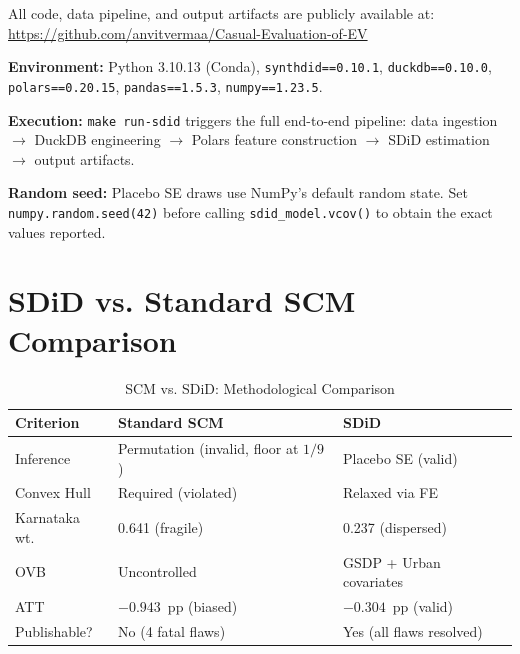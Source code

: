 \documentclass[journal]{IEEEtran}
\begin{document}
All code, data pipeline, and output artifacts are publicly available at:
\url{https://github.com/anvitvermaa/Casual-Evaluation-of-EV}

\noindent\textbf{Environment:} Python 3.10.13 (Conda), 
\texttt{synthdid==0.10.1}, \texttt{duckdb==0.10.0}, 
\texttt{polars==0.20.15}, \texttt{pandas==1.5.3}, 
\texttt{numpy==1.23.5}.

\noindent\textbf{Execution:} \texttt{make run-sdid} triggers the full 
end-to-end pipeline: data ingestion $\rightarrow$ DuckDB engineering 
$\rightarrow$ Polars feature construction $\rightarrow$ SDiD estimation 
$\rightarrow$ output artifacts.

\noindent\textbf{Random seed:} Placebo SE draws use NumPy's default 
random state. Set \texttt{numpy.random.seed(42)} before calling 
\texttt{sdid\_model.vcov()} to obtain the exact values reported.

\section{SDiD vs. Standard SCM Comparison}
\label{app:comparison}

\begin{table}[H]
\centering
\caption{SCM vs. SDiD: Methodological Comparison}
\label{tab:comparison}
\begin{tabular}{p{2.5cm}p{2.3cm}p{2.3cm}}
\toprule
\textbf{Criterion} & \textbf{Standard SCM} & \textbf{SDiD} \\
\midrule
Inference     & Permutation (invalid, floor at $1/9$) 
              & Placebo SE (valid) \\
Convex Hull   & Required (violated) 
              & Relaxed via FE \\
Karnataka wt. & 0.641 (fragile) 
              & 0.237 (dispersed) \\
OVB           & Uncontrolled 
              & GSDP + Urban covariates \\
ATT           & $-0.943$~pp (biased) 
              & $-0.304$~pp (valid) \\
Publishable?  & No (4 fatal flaws) 
              & Yes (all flaws resolved) \\
\bottomrule
\end{tabular}
\end{table}
\end{document}
